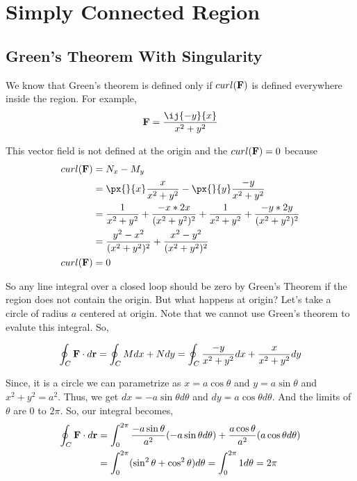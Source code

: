 

\chapter{Simply Connected Region}

\bigbreak

\section{Green's Theorem With Singularity}

We know that Green's theorem is defined only if $curl({\bf F})$ is defined everywhere inside the region.
For example, 
$$
{\bf F} = \frac{\ij{-y}{x}}{x^2 + y^2}
$$

This vector field is not defined at the origin and the $curl({\bf F}) = 0$ because
\begin{align*}
    curl({\bf F}) & = N_x - M_y \\
    & = \px{}{x} \frac{x}{x^2+y^2} - \px{}{y} \frac{-y}{x^2+y^2} \\
    & = \frac{1}{x^2 + y^2} + \frac{- x * 2x}{(x^2 + y^2)^2} + \frac{1}{x^2 + y^2} + \frac{- y * 2 y}{(x^2 + y^2)^2} \\
    & = \frac{y^2 - x^2}{(x^2 + y^2)^2} + \frac{x^2 - y^2}{(x^2 + y^2)^2} \\
    curl({\bf F}) & = 0
\end{align*}

So any line integral over a closed loop should be zero by Green's Theorem if the region does not contain the origin.
But what happens at origin? Let's take a circle of radius $a$ centered at origin. Note that we cannot use Green's theorem to evalute this integral.
So,

$$
\oint_C {\bf F} \cdot d{\bf r} = \oint_C Mdx + Ndy = \oint_C \frac{-y}{x^2 + y^2} dx + \frac{x}{x^2 + y^2} dy
$$

Since, it is a circle we can parametrize as $x = a \cos \theta$ and $y = a \sin \theta$ and $x^2 + y^2 = a^2$.
Thus, we get $dx = - a \sin \theta d\theta$ and $dy = a \cos \theta d\theta$.
And the limits of $\theta$ are  $0$ to $2\pi$.
So, our integral becomes, 
\begin{align*}
\oint_C {\bf F} \cdot d{\bf r} & = \int_0^{2\pi} \frac{- a \sin \theta}{a^2} (- a \sin \theta d\theta) + \frac{a \cos \theta}{a^2} (a \cos \theta d\theta) \\
& = \int_0^{2\pi} (\sin^2 \theta + \cos^2 \theta) d\theta = \int_0^{2\pi} 1 d\theta = 2 \pi
\end{align*}

